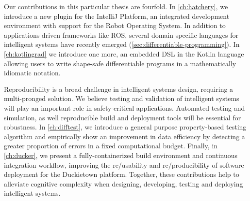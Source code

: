 Our contributions in this particular thesis are fourfold. In \autoref{ch:hatchery}, we introduce a new plugin for the IntelliJ Platform, an integrated development environment with support for the Robot Operating System. In addition to applications-driven frameworks like ROS, several domain specific languages for intelligent systems have recently emerged (\autoref{sec:differentiable-programming}). In \autoref{ch:kotlingrad} we introduce one more, an embedded DSL in the Kotlin language allowing users to write shape-safe differentiable programs in a mathematically idiomatic notation.

Reproducibility is a broad challenge in intelligent systems design, requiring a multi-pronged solution. We believe testing and validation of intelligent systems will play an important role in safety-critical applications. Automated testing and simulation, as well reproducible build and deployment tools will be essential for robustness. In \autoref{ch:difftest}, we introduce a general purpose property-based testing algorithm and empirically show an improvement in data efficiency by detecting a greater proportion of errors in a fixed computational budget. Finally, in \autoref{ch:ducker}, we present a fully-containerized build environment and continuous integration workflow, improving the re/usability and re/producibility of software deployment for the Duckietown platform. Together, these contributions help to alleviate cognitive complexity when designing, developing, testing and deploying intelligent systems.